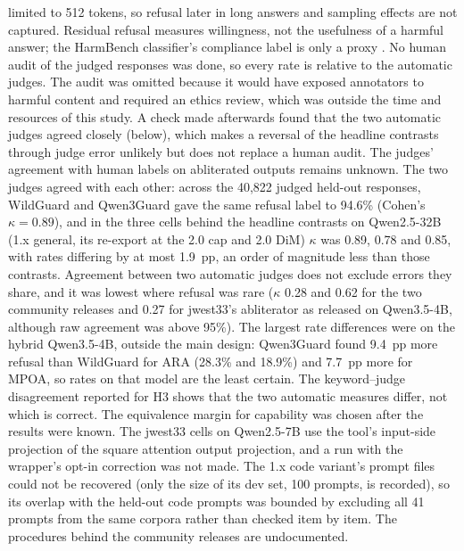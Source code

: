 limited to 512 tokens, so refusal later in long answers and sampling effects are not captured. Residual refusal
measures willingness, not the usefulness of a harmful answer; the HarmBench classifier's compliance label is only a
proxy \cite{carleo2026willing}. No human audit of the judged responses was done, so every rate is relative to the automatic judges. The audit was
omitted because it would have exposed annotators to harmful content and required an ethics review, which was outside
the time and resources of this study. A check made afterwards found that the two automatic judges agreed closely
(below), which makes a reversal of the headline contrasts through judge error unlikely but does not replace a human
audit. The judges'
agreement with human labels on abliterated outputs remains unknown. The two judges agreed with each other: across the 40,822
judged held-out responses, WildGuard and Qwen3Guard gave the same refusal label to 94.6\% (Cohen's $\kappa=0.89$),
and in the three cells behind the headline contrasts on Qwen2.5-32B (1.x general, its re-export at the 2.0 cap and
2.0 DiM) $\kappa$ was 0.89, 0.78 and 0.85, with rates differing by at most 1.9~pp, an order of magnitude less than
those contrasts. Agreement between two automatic judges does not exclude errors they share, and it was lowest where
refusal was rare ($\kappa$ 0.28 and 0.62 for the two community releases and 0.27 for jwest33's abliterator as
released on Qwen3.5-4B, although raw agreement was above 95\%). The largest rate differences were on the hybrid
Qwen3.5-4B, outside the main design: Qwen3Guard found 9.4~pp more refusal than WildGuard for ARA (28.3\% and
18.9\%) and 7.7~pp more for MPOA, so rates on that model are the least certain.
The keyword--judge disagreement reported for H3 shows that the
two automatic measures differ, not which is correct. The equivalence margin for capability was chosen after the
results were known. The jwest33 cells on Qwen2.5-7B use the tool's input-side projection of the square attention
output projection, and a run with the wrapper's opt-in correction was not made. The 1.x code variant's prompt files could not
be recovered (only the size of its dev set, 100 prompts, is recorded), so its overlap with the held-out code prompts was bounded by excluding all 41
prompts from the same corpora rather than checked item by item. The procedures behind the community releases are
undocumented.

